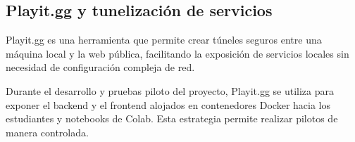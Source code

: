 \documentclass[letter,oneside,12pt,spanish]{report}
\begin{document}
\subsection{Playit.gg y tunelización de servicios}

Playit.gg es una herramienta que permite crear túneles seguros entre una máquina local y la web pública, facilitando la exposición de servicios locales sin necesidad de configuración compleja de red.

Durante el desarrollo y pruebas piloto del proyecto, Playit.gg se utiliza para exponer el backend y el frontend alojados en contenedores Docker hacia los estudiantes y notebooks de Colab. Esta estrategia permite realizar pilotos de manera controlada.


\newpage

%
%

\printbibliography




\end{document}
